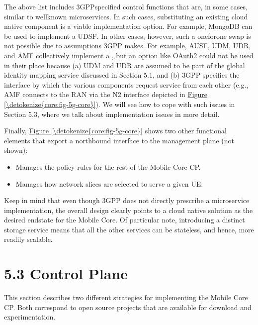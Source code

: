 \documentclass[a4paper,11pt,english]{sphinxmanual}
\begin{document}
\sphinxAtStartPar
The above list includes 3GPP\sphinxhyphen{}specified control functions that are, in
some cases, similar to well\sphinxhyphen{}known microservices.  In
such cases, substituting an existing cloud native component is a
viable implementation option. For example, MongoDB can be used to
implement a UDSF. In other cases, however, such a one\sphinxhyphen{}for\sphinxhyphen{}one swap is
not possible due to assumptions 3GPP makes. For example, AUSF, UDM,
UDR, and AMF collectively implement a , but an option like OAuth2 could not be used in
their place because (a) UDM and UDR are assumed to be part of the
global identity mapping service discussed in Section 5.1, and (b) 3GPP
specifies the interface by which the various components request
service from each other (e.g., AMF connects to the RAN via the N2 interface
depicted in \hyperref[\detokenize{core:fig-5g-core}]{Figure \ref{\detokenize{core:fig-5g-core}}}). We will see how to cope
with such issues in Section 5.3, where we talk about implementation issues
in more detail.

\sphinxAtStartPar
Finally, \hyperref[\detokenize{core:fig-5g-core}]{Figure \ref{\detokenize{core:fig-5g-core}}} shows two other functional
elements that export a northbound interface to the management plane
(not shown):
\begin{itemize}
\item {} 
\sphinxAtStartPar
{} Manages the policy rules for the
rest of the Mobile Core CP.

\item {} 
\sphinxAtStartPar
{} Manages how network
slices are selected to serve a given UE.

\end{itemize}

\sphinxAtStartPar
Keep in mind that even though 3GPP does not directly prescribe a
microservice implementation, the overall design clearly points to a
cloud native solution as the desired end\sphinxhyphen{}state for the Mobile Core.
Of particular note, introducing a distinct storage service means that
all the other services can be stateless, and hence, more readily
scalable.


\section{5.3 Control Plane}
\label{\detokenize{core:control-plane}}
\sphinxAtStartPar
This section describes two different strategies for implementing the
Mobile Core CP. Both correspond to open source projects that are
available for download and experimentation.
\end{document}
